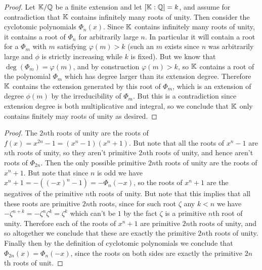 \documentclass[11pt]{article}
\begin{document}
\begin{proof}
  Let $\mathbb{K}/\mathbb{Q}$ be a finite extension and let $[\mathbb{K}:\mathbb{Q}] = k$, and assume for contradiction that $\mathbb{K}$ contains infinitely many roots of unity.
  Then consider the cyclotomic polynomials $\Phi_n(x)$.
  Since $\mathbb{K}$ contains infinitely many roots of unity, it contains a root of $\Phi_n$ for arbitrarily large $n$.
  In particular it will contain a root for a $\Phi_m$ with $m$ satisfying $\varphi(m) > k$ (such an $m$ exists since $n$ was arbitrarily large and $\phi$ is strictly increasing while $k$ is fixed).
  But we know that $\deg(\Phi_m) = \varphi(m)$, and by construction $\varphi(m) > k$, so $\mathbb{K}$ contains a root of the polynomial $\Phi_m$ which has degree larger than its extension degree.
  Therefore $\mathbb{K}$ contains the extension generated by this root of $\Phi_m$, which is an extension of degree $\phi(m)$ by the irreducibility of $\Phi_m$.
  But this is a contradiction since extension degree is both multiplicative and integral, so we conclude that $\mathbb{K}$ only contains finitely may roots of unity as desired.
\end{proof}


\begin{proof}
  The $2n$th roots of unity are the roots of $f(x) = x^{2n}-1 = (x^n-1)(x^n+1)$.
  But note that all the roots of $x^n - 1$ are $n$th roots of unity, so they aren't primitive $2n$th roots of unity, and hence aren't roots of $\Phi_{2n}$.
  Then the only possible primitive $2n$th roots of unity are the roots of $x^n + 1$. But note that since $n$ is odd we have $x^n + 1 = -((-x)^n - 1) = -\Phi_n(-x)$, so the roots of $x^n + 1$ are the negatives of the primitive $n$th roots of unity.
  But note that this implies that all these roots are primitive $2n$th roots, since for such root $\zeta$ any $k < n$ we have $-\zeta^{n+k} = -\zeta^n\zeta^k = \zeta^k$ which can't be $1$ by the fact $\zeta$ is a primitive $n$th root of unity.
  Therefore each of the roots of $x^n + 1$ are primitive $2n$th roots of unity, and so altogether we conclude that these are exactly the primitive $2n$th roots of unity.
  Finally then by the definition of cyclotomic polynomials we conclude that $\Phi_{2n}(x) = \Phi_n(-x)$, since the roots on both sides are exactly the primitive $2n$th roots of unit.
\end{proof}
\end{document}
